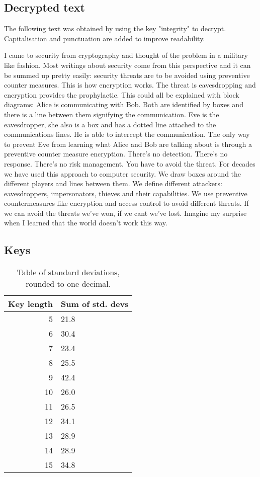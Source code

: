 \subsection{Decrypted text}
The following text was obtained by using the key "integrity" to decrypt. Capitalisation and punctuation are added to improve readability.

I came to security from cryptography and thought of the problem in a military like fashion. Most writings about security come from this perspective and it can be summed up pretty easily: security threats are to be avoided using preventive counter measures. This is how encryption works. The threat is eavesdropping and encryption provides the prophylactic. This could all be explained with block diagrams: Alice is communicating with Bob. Both are identified by boxes and there is a line between them signifying the communication. Eve is the eavesdropper, she also is a box and has a dotted line attached to the communications lines. He is able to intercept the communication. The only way to prevent Eve from learning what Alice and Bob are talking about is through a preventive counter measure encryption. There's no detection. There's no response. There's no risk management. You have to avoid the threat. For decades we have used this approach to computer security. We draw boxes around the different players and lines between them. We define different attackers: eavesdroppers, impersonators, thieves and their capabilities. We use preventive countermeasures like encryption and access control to avoid different threats. If we can avoid the threats we've won, if we cant we've lost. Imagine my surprise when I learned that the world doesn't work this way.

\subsection{Keys}
\begin{table}[h]
	\centering
	\caption{Table of standard deviations, rounded to one decimal.}
	\label{tbl:stddevs}
	\begin{tabular}{r|l}
		Key length & Sum of std. devs \\
		\hline
		 5 & 21.8 \\
		 6 & 30.4 \\
		 7 & 23.4 \\
		 8 & 25.5 \\
		 9 & 42.4 \\
		10 & 26.0 \\
		11 & 26.5 \\
		12 & 34.1 \\
		13 & 28.9 \\
		14 & 28.9 \\
		15 & 34.8 
	\end{tabular}
\end{table}

